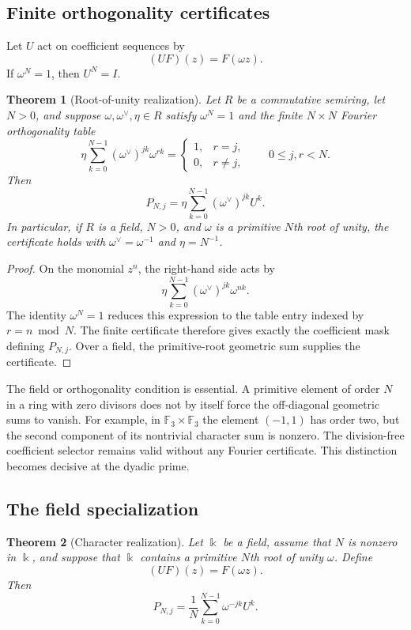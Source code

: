 \documentclass[11pt,a4paper]{article}
\newtheorem{theorem}{Theorem}[section]
\theoremstyle{definition}
\theoremstyle{remark}
\newcommand{\bbk}{\Bbbk}
\providecommand{\bbk}{\mathbb{k}}
\theoremstyle{definition}\newtheorem{construction}[theorem]{Construction}\newtheorem{certificate}[theorem]{Numerical Certificate}
\theoremstyle{remark}\newtheorem{boundary}[theorem]{Boundary}
\begin{document}
\subsection{Finite orthogonality certificates}

Let $U$ act on coefficient sequences by
\[
(UF)(z)=F(\omega z).
\]
If $\omega^N=1$, then $U^N=I$.

\begin{theorem}[Root-of-unity realization]\label{thm:root-of-unity}
Let $R$ be a commutative semiring, let $N>0$, and suppose
$\omega,\omega^\vee,\eta\in R$ satisfy $\omega^N=1$ and the finite
$N\times N$ Fourier orthogonality table
\[
\eta\sum_{k=0}^{N-1}(\omega^\vee)^{jk}\omega^{rk}
=
\begin{cases}
1,&r=j,\\
0,&r\ne j,
\end{cases}
\qquad 0\le j,r<N.
\]
Then
\[
\boxed{
P_{N,j}
=
\eta\sum_{k=0}^{N-1}(\omega^\vee)^{jk}U^k.
}
\]
In particular, if $R$ is a field, $N>0$, and $\omega$ is a primitive
$N$th root of unity, the certificate holds with
$\omega^\vee=\omega^{-1}$ and $\eta=N^{-1}$.
\end{theorem}

\begin{proof}
On the monomial $z^n$, the right-hand side acts by
\[
\eta\sum_{k=0}^{N-1}(\omega^\vee)^{jk}\omega^{nk}.
\]
The identity $\omega^N=1$ reduces this expression to the table entry indexed
by $r=n\bmod N$. The finite certificate therefore gives exactly the
coefficient mask defining $P_{N,j}$.
Over a field, the primitive-root geometric sum supplies the certificate.
\end{proof}

The field or orthogonality condition is essential. A primitive element of
order $N$ in a ring with zero divisors does not by itself force the off-diagonal
geometric sums to vanish. For example, in $\mathbb F_3\times\mathbb F_3$ the
element $(-1,1)$ has order two, but the second component of its nontrivial
character sum is nonzero. The division-free coefficient selector remains valid
without any Fourier certificate. This distinction becomes decisive at the
dyadic prime.


\subsection{The field specialization}
\begin{theorem}[Character realization]\label{thm:character_realization}
Let $\bbk$ be a field, assume that $N$ is nonzero in $\bbk$, and suppose that $\bbk$ contains a primitive $N$th root of unity $\omega$.  Define
\[
(UF)(z)=F(\omega z).
\]
Then
\[
P_{N,j}
=
\frac1N\sum_{k=0}^{N-1}\omega^{-jk}U^k.
\]
\end{theorem}
\end{document}
